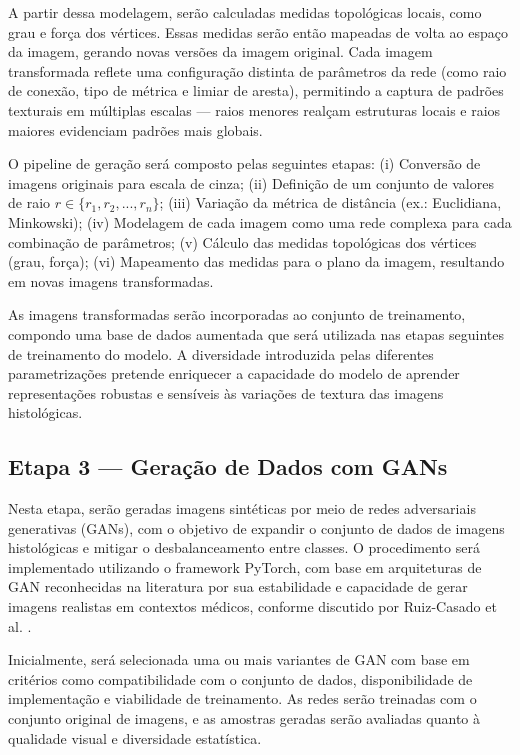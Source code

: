 A partir dessa modelagem, serão calculadas medidas topológicas locais, como grau e força dos vértices. Essas medidas serão então mapeadas de volta ao espaço da imagem, gerando novas versões da imagem original. Cada imagem transformada reflete uma configuração distinta de parâmetros da rede (como raio de conexão, tipo de métrica e limiar de aresta), permitindo a captura de padrões texturais em múltiplas escalas — raios menores realçam estruturas locais e raios maiores evidenciam padrões mais globais.

O pipeline de geração será composto pelas seguintes etapas: (i) Conversão de imagens originais para escala de cinza; (ii) Definição de um conjunto de valores de raio \( r \in \{r_1, r_2, ..., r_n\} \); (iii) Variação da métrica de distância (ex.: Euclidiana, Minkowski); (iv) Modelagem de cada imagem como uma rede complexa para cada combinação de parâmetros; (v) Cálculo das medidas topológicas dos vértices (grau, força);  (vi) Mapeamento das medidas para o plano da imagem, resultando em novas imagens transformadas.

As imagens transformadas serão incorporadas ao conjunto de treinamento, compondo uma base de dados aumentada que será utilizada nas etapas seguintes de treinamento do modelo. A diversidade introduzida pelas diferentes parametrizações pretende enriquecer a capacidade do modelo de aprender representações robustas e sensíveis às variações de textura das imagens histológicas.

\subsection{Etapa 3 — Geração de Dados com GANs}

Nesta etapa, serão geradas imagens sintéticas por meio de redes adversariais generativas (GANs), com o objetivo de expandir o conjunto de dados de imagens histológicas e mitigar o desbalanceamento entre classes. O procedimento será implementado utilizando o framework PyTorch, com base em arquiteturas de GAN reconhecidas na literatura por sua estabilidade e capacidade de gerar imagens realistas em contextos médicos, conforme discutido por Ruiz-Casado et al. \cite{ruiz2024gan}.

Inicialmente, será selecionada uma ou mais variantes de GAN com base em critérios como compatibilidade com o conjunto de dados, disponibilidade de implementação e viabilidade de treinamento. As redes serão treinadas com o conjunto original de imagens, e as amostras geradas serão avaliadas quanto à qualidade visual e diversidade estatística.

